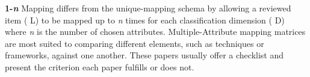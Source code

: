 \textbf{1-\textit{n} }Mapping differs from the unique-mapping schema by allowing a reviewed item ({\color{blue} L}) to be mapped up to \textit{n} times for each classification dimension ({\color{red} D}) where \textit{n} is the number of chosen attributes. Multiple-Attribute mapping matrices are most suited to comparing different elements, such as techniques or frameworks, against one another. These papers usually offer a checklist and present the criterion each paper fulfills or does not.

%

